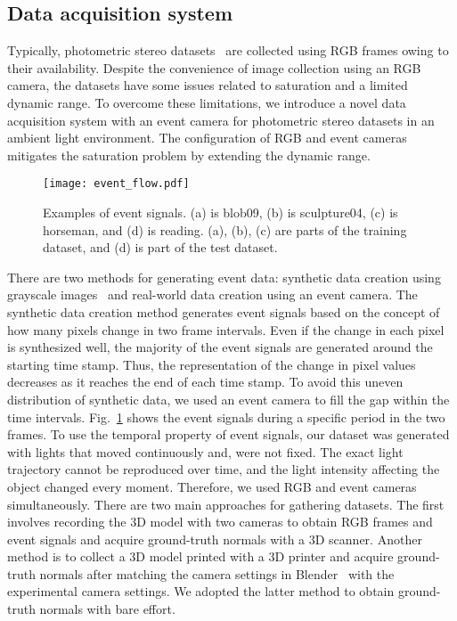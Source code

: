 \subsection{Data acquisition system}
Typically, photometric stereo datasets~\citep{chen2018ps,ikehata2018cnn,shi2016benchmark} are collected using RGB frames owing to their availability.
Despite the convenience of image collection using an RGB camera, the datasets have some issues related to saturation and a limited dynamic range. To overcome these limitations, we introduce a novel data acquisition system with an event camera for photometric stereo datasets in an ambient light environment. The configuration of RGB and event cameras mitigates the saturation problem by extending the dynamic range.

\begin{figure}[t]
    \centering
    \texttt{[image: event\_flow.pdf]}
    \caption{Examples of event signals. (a) is blob09, (b) is sculpture04, (c) is horseman, and (d) is reading. (a), (b), (c) are parts of the training dataset, and (d) is part of the test dataset.}
    \label{fig:event_flow}
\end{figure}
There are two methods for generating event data: synthetic data creation using grayscale images~\citep{hu2021v2e} and real-world data creation using an event camera. The synthetic data creation method generates event signals based on the concept of how many pixels change in two frame intervals. Even if the change in each pixel is synthesized well, the majority of the event signals are generated around the starting time stamp. Thus, the representation of the change in pixel values decreases as it reaches the end of each time stamp. To avoid this uneven distribution of synthetic data, we used an event camera to fill the gap within the time intervals. Fig.~\ref{fig:event_flow} shows the event signals during a specific period in the two frames. To use the temporal property of event signals, our dataset was generated with lights that moved continuously and, were not fixed. The exact light trajectory cannot be reproduced over time, and the light intensity affecting the object changed every moment. Therefore, we used RGB and event cameras simultaneously. There are two main approaches for gathering datasets. The first involves recording the 3D model with two cameras to obtain RGB frames and event signals and acquire ground-truth normals with a 3D scanner. Another method is to collect a 3D model printed with a 3D printer and acquire ground-truth normals after matching the camera settings in Blender~\citep{blender} with the experimental camera settings. We adopted the latter method to obtain ground-truth normals with bare effort.


